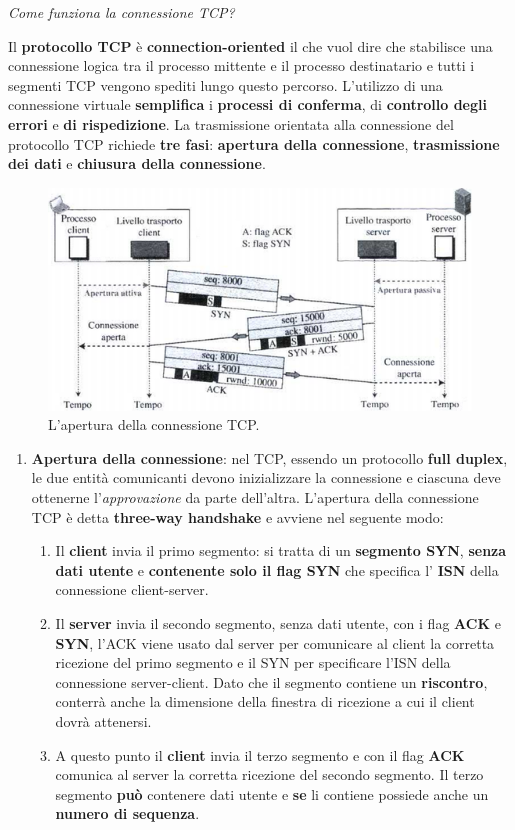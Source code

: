 \documentclass[11pt,a4paper]{article}
\theoremstyle{definition}
\begin{document}
\begin{flushleft}
	\textit{Come funziona la connessione TCP?}
\end{flushleft}
Il \textbf{protocollo TCP} è \textbf{connection-oriented} il che vuol dire che stabilisce una connessione logica tra il processo mittente e il processo destinatario e tutti i segmenti TCP vengono spediti lungo questo percorso. L'utilizzo di una connessione virtuale \textbf{semplifica} i \textbf{processi di conferma}, di \textbf{controllo degli errori} e \textbf{di rispedizione}. La trasmissione orientata alla connessione del protocollo TCP richiede \textbf{tre fasi}: \textbf{apertura della connessione}, \textbf{trasmissione dei dati} e \textbf{chiusura della connessione}.
\begin{figure}[!h]
	\includegraphics[scale=0.44]{Immagini/Three_way.png}
	\centering
	\caption{L'apertura della connessione TCP.}
\end{figure}
\newpage
\begin{enumerate}
	\item \textbf{Apertura della connessione}: nel TCP, essendo un protocollo \textbf{full duplex}, le due entità comunicanti devono inizializzare la connessione e ciascuna deve ottenerne l'\textit{approvazione} da parte dell'altra. L'apertura della connessione TCP è detta \textbf{three-way handshake} e avviene nel seguente modo:
	      \begin{enumerate}[label*=\arabic*.]
		      \item Il \textbf{client} invia il primo segmento: si tratta di un \textbf{segmento SYN}, \textbf{senza dati utente} e \textbf{contenente solo il flag SYN} che specifica l' \textbf{ISN} della connessione client-server.
		      \item Il \textbf{server} invia il secondo segmento, senza dati utente, con i flag \textbf{ACK} e \textbf{SYN}, l'ACK viene usato dal server per comunicare al client la corretta ricezione del primo segmento e il SYN per specificare l'ISN della connessione server-client. Dato che il segmento contiene un \textbf{riscontro}, conterrà anche la dimensione della finestra di ricezione a cui il client dovrà attenersi.
		      \item A questo punto il \textbf{client} invia il terzo segmento e con il flag \textbf{ACK} comunica al server la corretta ricezione del secondo segmento. Il terzo segmento \textbf{può} contenere dati utente e \textbf{se} li contiene possiede anche un \textbf{numero di sequenza}.
	      \end{enumerate}
\end{enumerate}
\end{document}
